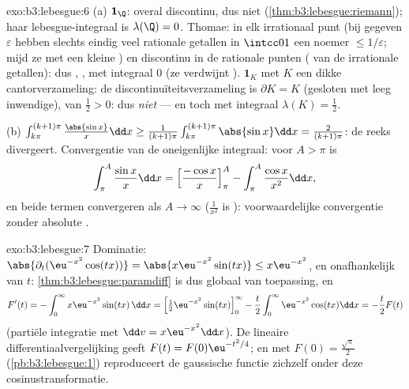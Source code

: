 \begin{solution}{exo:b3:lebesgue:6}
(a) $\mathbf 1_\Q$: overal discontinu, dus niet
 (\cref{thm:b3:lebesgue:riemann}); haar
lebesgue-integraal is $\lambda(\Q) = 0$. Thomae:  in elk
irrationaal punt (bij gegeven $\varepsilon$ hebben slechts eindig
veel rationale getallen in $\intcc01$ een noemer $\leq
1/\varepsilon$; mijd ze met een kleine ) en discontinu in
de rationale punten ( van de irrationale getallen): dus
 , , met integraal $0$ (ze
verdwijnt ). $\mathbf 1_K$ met $K$ een dikke
cantorverzameling: de discontinuïteitsverzameling is $\partial K =
K$ (gesloten met leeg inwendige), van  $\frac12 > 0$: dus
\emph{niet}  --- en toch
 met integraal $\lambda(K) = \frac12$.

(b) $\int_{k\pi}^{(k+1)\pi}\frac{\abs{\sin x}}x\dd x \geq
\frac1{(k+1)\pi}\int_{k\pi}^{(k+1)\pi}\abs{\sin x}\dd x =
\frac{2}{(k+1)\pi}$: de reeks divergeert. Convergentie van de
oneigenlijke integraal: voor $A > \pi$ is
\[
\int_\pi^A\frac{\sin x}x\dd x = \Bigl[\frac{-\cos
x}x\Bigr]_\pi^A - \int_\pi^A\frac{\cos x}{x^2}\dd x,
\]
en beide termen convergeren als $A \to \infty$ ($\frac1{x^2}$ is
): voorwaardelijke convergentie zonder absolute
.
\end{solution}

\begin{solution}{exo:b3:lebesgue:7}
Dominatie: $\abs{\partial_t(\eu^{-x^2}\cos(tx))} =
\abs{x\eu^{-x^2}\sin(tx)} \leq x\eu^{-x^2}$,  en
onafhankelijk van $t$: \cref{thm:b3:lebesgue:paramdiff} is dus
globaal van toepassing, en
\[
F'(t) = -\int_0^\infty x\eu^{-x^2}\sin(tx)\,\dd x
= \Bigl[\tfrac12\eu^{-x^2}\sin(tx)\Bigr]_0^\infty
- \frac t2\int_0^\infty\eu^{-x^2}\cos(tx)\dd x
= -\frac t2F(t)
\]
(partiële integratie met $\dd v = x\eu^{-x^2}\dd x$). De lineaire
differentiaalvergelijking geeft $F(t) = F(0)\eu^{-t^2/4}$; en met
$F(0) = \frac{\sqrt\pi}2$ (\cref{pb:b3:lebesgue:1}) reproduceert
de gaussische functie zichzelf onder deze cosinustransformatie.
\end{solution}

